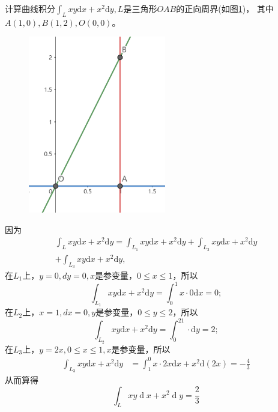 \documentclass[lang=cn,10pt]{elegantbook}
\begin{document}
\begin{example}
    计算曲线积分$\int_{L}xy\mathrm{d}x+x^{2}\mathrm{d}y,L$是三角形$OAB$的正向周界(如图\ref{im11_1})，
    其中$A(1,0),B(1,2),O(0,0)$。
    \begin{figure}[ht]
        \centering
        \includegraphics[width = 6cm]{img/im11_1.png}
        \caption{}
        \label{im11_1}
    \end{figure}
\end{example}

\begin{solution}
    因为
    \begin{equation*}
        \begin{gathered}
            \int_{L}xy\mathrm{d}x+x^2\mathrm{d}y =\int_{L_{1}}xy\mathrm{d}x+x^{2}\mathrm{d}y+\int_{L_{2}}xy\mathrm{d}x+x^{2}\mathrm{d}y \\
            +\int_{L_3}xy\mathrm{d}x+x^2\mathrm{d}y,
        \end{gathered}
    \end{equation*}
    在$L_1$上，$y=0,dy=0,x$是参变量，$0\leq x \leq 1$，所以
    \begin{equation*}
        \int_{L_1}xy\mathrm{d}x+x^2\mathrm{d}y=\int_0^1x\cdot0\mathrm{d}x=0;
    \end{equation*}
    在$L_2$上，$x=1,dx=0,y$是参变量，$0\leq y \leq 2$，所以
    \begin{equation*}
        \int_{L_2}xy\mathrm{d}x+x^2\mathrm{d}y=\int_0^21\cdot\mathrm{d}y=2;
    \end{equation*}
    在$L_3$上，$y=2x,0\leq x \leq 1,x$是参变量，所以
    \begin{equation*}
        \begin{aligned}
            \int_{L_3}xy\mathrm{d}x+x^2\mathrm{d}y & =\int_1^0x\cdot2x\mathrm{d}x+x^2\mathrm{d}(2x)=-\frac43
        \end{aligned}
    \end{equation*}
    从而算得
    \begin{equation*}
        \int_Lxy\operatorname{d}x+x^2\operatorname{d}y=\frac23
    \end{equation*}
\end{solution}
\end{document}
